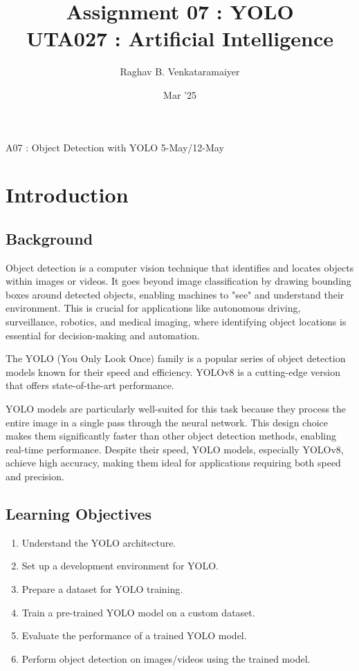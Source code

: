 \documentclass[11pt]{article}
\author{Raghav B. Venkataramaiyer}
\date{Mar '25}
\title{Assignment 07 : YOLO\\\medskip
\large UTA027 : Artificial Intelligence}
\begin{document}
\maketitle
A07 : Object Detection with YOLO
5-May/12-May


\section{Introduction}
\label{sec:org64c8cc6}
\subsection{Background}
\label{sec:orgbf8c81b}

Object detection is a computer vision technique that
identifies and locates objects within images or
videos.   It goes beyond image classification by drawing
bounding boxes around detected objects, enabling
machines to "see" and understand their
environment.   This is crucial for applications like
autonomous driving, surveillance, robotics, and medical
imaging, where identifying object locations is
essential for decision-making and automation.

The YOLO (You Only Look Once) family is a popular
series of object detection models known for their speed
and efficiency.  YOLOv8 is a cutting-edge version that
offers state-of-the-art performance.

YOLO models are particularly well-suited for this task
because they process the entire image in a single pass
through the neural network.  This design choice makes
them significantly faster than other object detection
methods, enabling real-time performance.  Despite their
speed, YOLO models, especially YOLOv8, achieve high
accuracy, making them ideal for applications requiring
both speed and precision.

\subsection{Learning Objectives}
\label{sec:orgba18a2f}
\begin{enumerate}
\item Understand the YOLO architecture.
\item Set up a development environment for YOLO.
\item Prepare a dataset for YOLO training.
\item Train a pre-trained YOLO model on a custom dataset.
\item Evaluate the performance of a trained YOLO model.
\item Perform object detection on images/videos using the
trained model.
\end{enumerate}
\end{document}

